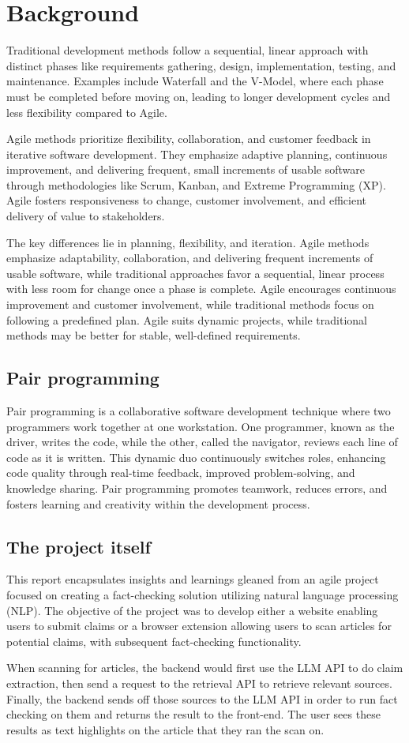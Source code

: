 \section{Background}
Traditional development methods follow a sequential, linear approach with distinct phases like requirements gathering, design, implementation, testing, and maintenance. Examples include Waterfall and the V-Model, where each phase must be completed before moving on, leading to longer development cycles and less flexibility compared to Agile.

Agile methods prioritize flexibility, collaboration, and customer feedback in iterative software development. They emphasize adaptive planning, continuous improvement, and delivering frequent, small increments of usable software through methodologies like Scrum, Kanban, and Extreme Programming (XP). Agile fosters responsiveness to change, customer involvement, and efficient delivery of value to stakeholders.

The key differences lie in planning, flexibility, and iteration. Agile methods emphasize adaptability, collaboration, and delivering frequent increments of usable software, while traditional approaches favor a sequential, linear process with less room for change once a phase is complete. Agile encourages continuous improvement and customer involvement, while traditional methods focus on following a predefined plan. Agile suits dynamic projects, while traditional methods may be better for stable, well-defined requirements.

\subsection{Pair programming}
Pair programming is a collaborative software development technique where two programmers work together at one workstation. One programmer, known as the driver, writes the code, while the other, called the navigator, reviews each line of code as it is written. This dynamic duo continuously switches roles, enhancing code quality through real-time feedback, improved problem-solving, and knowledge sharing. Pair programming promotes teamwork, reduces errors, and fosters learning and creativity within the development process.


\subsection{The project itself}
This report encapsulates insights and learnings gleaned from an agile project focused on creating a fact-checking solution utilizing natural language processing (NLP). The objective of the project was to develop either a website enabling users to submit claims or a browser extension allowing users to scan articles for potential claims, with subsequent fact-checking functionality. 

When scanning for articles, the backend would first use the LLM API to do claim extraction, then send a request to the retrieval API to retrieve relevant sources. Finally, the backend sends off those sources to the LLM API in order to run fact checking on them and returns the result to the front-end. The user sees these results as text highlights on the article that they ran the scan on.
